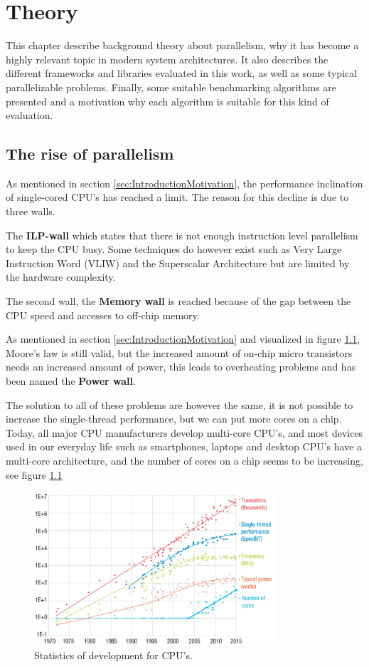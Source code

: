 
\chapter{Theory}
This chapter describe background theory about parallelism, why it has become a highly relevant topic in modern system architectures. It also describes the different frameworks and libraries evaluated in this work, as well as some typical parallelizable problems. Finally, some suitable benchmarking algorithms are presented and a motivation why each algorithm is suitable for this kind of evaluation.

\section{The rise of parallelism} 
As mentioned in section \ref{sec:IntroductionMotivation}, the performance inclination of single-cored CPU's has reached a limit. The reason for this decline is due to three walls.

The \textbf{ILP-wall} which states that there is not enough instruction level parallelism to keep the CPU busy. Some techniques do however exist such as Very Large Instruction Word (VLIW) and the Superscalar Architecture but are limited by the hardware complexity.

The second wall, the \textbf{Memory wall} is reached because of the gap between the CPU speed and accesses to off-chip memory.

As mentioned in section \ref{sec:IntroductionMotivation} and visualized in figure \ref{fig:CPUstats}, Moore's law is still valid, but the increased amount of on-chip micro transistors needs an increased amount of power, this leads to overheating problems and has been named the \textbf{Power wall}.

The solution to all of these problems are however the same, it is not possible to increase the single-thread performance, but we can put more cores on a chip. Today, all major CPU manufacturers develop multi-core CPU's, and most devices used in our everyday life such as smartphones, laptops 
and desktop CPU's have a multi-core architecture, and the number of cores on a chip seems to be increasing, see figure \ref{fig:CPUstats}

\begin{figure}[!h]
    \centering
    \includegraphics[width=0.8\textwidth]{Introduction/Figs/CPUStats.png}
    \caption{Statistics of development for CPU's. \cite{CPUStats}}
    \label{fig:CPUstats}
\end{figure}

